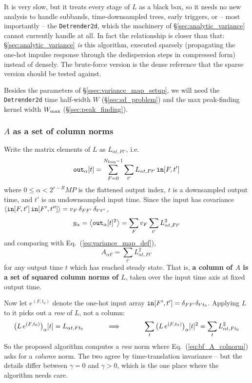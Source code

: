 \documentclass{article}
\numberwithin{equation}{section}   %
\begin{document}
It is very slow, but it treats every stage of $L$ as a black box, so it needs no new analysis to
handle subbands, time-downsampled trees, early triggers, or -- most importantly -- the
{\tt Detrender2d}, which the machinery of \S\ref{sec:analytic_variance} cannot currently handle at
all. In fact the relationship is closer than that: \S\ref{sec:analytic_variance} {\em is} this
algorithm, executed sparsely (propagating the one-hot impulse response through the dedispersion
steps in compressed form) instead of densely. The brute-force version is the dense reference that
the sparse version should be tested against.

Besides the parameters of \S\ref{ssec:variance_map_setup}, we will need the {\tt Detrender2d} time
half-width $W$ (\S\ref{sec:sd_problem}) and the max peak-finding kernel width $W_{\rm max}$
(\S\ref{sec:peak_finding}).

\subsubsection{$A$ as a set of column norms}

Write the matrix elements of $L$ as $L_{\alpha t, F t'}$, i.e.
\begin{equation}
{\tt out}_\alpha[t] = \sum_{F=0}^{N_{\rm freq}-1} \sum_{t'} L_{\alpha t, F t'} \, {\tt in}[F,t']
\label{eq:bf_L_matrix}
\end{equation}
where $0 \le \alpha < 2^{r-R}MP$ is the flattened output index, $t$ is a downsampled output time,
and $t'$ is an undownsampled input time. Since the input has covariance
$\langle {\tt in}[F,t'] \, {\tt in}[F',t''] \rangle = v_F \, \delta_{FF'} \, \delta_{t't''}$,
\begin{equation}
y_\alpha = \big\langle {\tt out}_\alpha[t]^2 \big\rangle = \sum_F v_F \sum_{t'} L_{\alpha t, F t'}^2
\end{equation}
and comparing with Eq.\ (\ref{eq:variance_map_def}),
\begin{equation}
A_{\alpha F} = \sum_{t'} L_{\alpha t, F t'}^2
\label{eq:bf_A_colnorm}
\end{equation}
for any output time $t$ which has reached steady state. That is, {\bf a column of $A$ is a set of
squared column norms of $L$}, taken over the input time axis at fixed output time.

Now let $e^{(F,t_0)}$ denote the one-hot input array ${\tt in}[F',t'] = \delta_{FF'} \delta_{t't_0}$.
Applying $L$ to it picks out a {\em row} of $L$, not a column:
\begin{equation}
\big( L \, e^{(F,t_0)} \big)_\alpha[t] = L_{\alpha t, F t_0}
\hspace{1.2cm}\Longrightarrow\hspace{1.2cm}
\sum_t \big( L \, e^{(F,t_0)} \big)_\alpha[t]^2 = \sum_t L_{\alpha t, F t_0}^2
\label{eq:bf_rownorm}
\end{equation}
So the proposed algorithm computes a {\em row} norm where Eq.\ (\ref{eq:bf_A_colnorm}) asks for a
{\em column} norm. The two agree by time-translation invariance -- but the details differ between
$\gamma=0$ and $\gamma>0$, which is the one place where the algorithm needs care.
\end{document}
